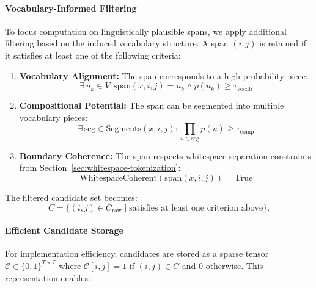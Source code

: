 \paragraph{Vocabulary-Informed Filtering}

To focus computation on linguistically plausible spans, we apply additional filtering based on the induced vocabulary structure. A span \((i,j)\) is retained if it satisfies at least one of the following criteria:

\begin{enumerate}
	\item \textbf{Vocabulary Alignment:} The span corresponds to a high-probability piece:
	\begin{equation}
	\exists \, u_k \in V : \text{span}(x, i, j) = u_k \wedge p(u_k) \geq \tau_{\text{vocab}}
	\label{eq:vocab-alignment}
	\end{equation}
	
	\item \textbf{Compositional Potential:} The span can be segmented into multiple vocabulary pieces:
	\begin{equation}
	\exists \, \text{seg} \in \text{Segments}(x, i, j) : \prod_{u \in \text{seg}} p(u) \geq \tau_{\text{comp}}
	\label{eq:compositional-potential}
	\end{equation}
	
	\item \textbf{Boundary Coherence:} The span respects whitespace separation constraints from Section~\ref{sec:whitespace-tokenization}:
	\begin{equation}
	\text{WhitespaceCoherent}(\text{span}(x, i, j)) = \text{True}
	\label{eq:boundary-coherence}
	\end{equation}
\end{enumerate}

The filtered candidate set becomes:
\begin{equation}
C = \{(i,j) \in C_{\text{raw}} \mid \text{satisfies at least one criterion above}\}.
\label{eq:filtered-candidates}
\end{equation}

\paragraph{Efficient Candidate Storage}

For implementation efficiency, candidates are stored as a sparse tensor \(\mathcal{C} \in \{0,1\}^{T \times T}\) where \(\mathcal{C}[i,j] = 1\) if \((i,j) \in C\) and 0 otherwise. This representation enables:

